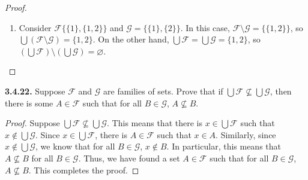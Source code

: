 \documentclass[12pt]{amsart}
\newenvironment{statement}[1]{\smallskip\noindent\color[rgb]{.6627, .3529, .6314} {\bf #1.}}{}
\theoremstyle{definition}
\theoremstyle{remark}
\begin{document}
\begin{proof}
\begin{enumerate}
	To prove the other direction, we work with the contrapositive statement:
	if there exist $A \in \mathcal{F} \setminus \mathcal{G}$ and $B \in \mathcal{G}$ such that
	$A \cap B \neq \varnothing$, then
	$\bigcup (\mathcal{F} \setminus \mathcal{G})
	\nsubseteq \left( \bigcup \mathcal{F} \right) \setminus \left( \bigcup \mathcal{G} \right)$.
	Suppose there is $A \in \mathcal{F} \setminus \mathcal{G}$ and $B \in \mathcal{G}$ such that
	$A \cap B \neq \varnothing$.
	Then, since $A \cap B \neq \varnothing$, there exists $x \in A \cap B$.
	Since $x \in A$ and $A \in \mathcal{F} \setminus \mathcal{G}$,
	$x \in \bigcup (\mathcal{F} \setminus \mathcal{G})$.
	In addition, since $A$ is in particular an element of $\mathcal{F}$, $x \in \bigcup \mathcal{F}$.
	On the other hand, since $x \in B$ and $B \in \mathcal{G}$, $x \in \bigcup \mathcal{G}$ as well.
	This means that $x \notin \left( \bigcup \mathcal{F} \right) 
	\setminus \left( \bigcup \mathcal{G} \right)$.
	In other words, this proves that $\bigcup (\mathcal{F} \setminus \mathcal{G})
	\nsubseteq \left( \bigcup \mathcal{F} \right) \setminus \left( \bigcup \mathcal{G} \right)$.
	This completes the proof.
	
	\item Consider $\mathcal{F} \{ \{1\}, \{1, 2\} \}$ and $\mathcal{G} = \{ \{1\}, \{2\} \}$.
	In this case, $\mathcal{F} \setminus \mathcal{G} = \{ \{1, 2\} \}$,
	so $\bigcup (\mathcal{F} \setminus \mathcal{G}) = \{ 1, 2 \}$.
	On the other hand, $\bigcup \mathcal{F} = \bigcup \mathcal{G} = \{ 1, 2 \}$,
	so $\left( \bigcup \mathcal{F} \right) \setminus \left( \bigcup \mathcal{G} \right) = \varnothing$.
\end{enumerate}
\end{proof}


\begin{statement}{3.4.22}
Suppose $\mathcal{F}$ and $\mathcal{G}$ are families of sets.
Prove that if $\bigcup \mathcal{F} \nsubseteq \bigcup \mathcal{G}$, then there is some $A \in \mathcal{F}$ such that for all $B \in \mathcal{G}$, $A \nsubseteq B$.
\end{statement}

\begin{proof}
Suppose $\bigcup \mathcal{F} \nsubseteq \bigcup \mathcal{G}$.
This means that there is $x \in \bigcup \mathcal{F}$ such that $x \notin \bigcup \mathcal{G}$.
Since $x \in \bigcup \mathcal{F}$, there is $A \in \mathcal{F}$ such that $x \in A$.
Similarly, since $x \notin \bigcup \mathcal{G}$, we know that for all $B \in \mathcal{G}$, $x \notin B$.
In particular, this means that $A \nsubseteq B$ for all $B \in \mathcal{G}$.
Thus, we have found a set $A \in \mathcal{F}$ such that for all $B \in \mathcal{G}$, $A \nsubseteq B$.
This completes the proof.
\end{proof}
\end{document}
